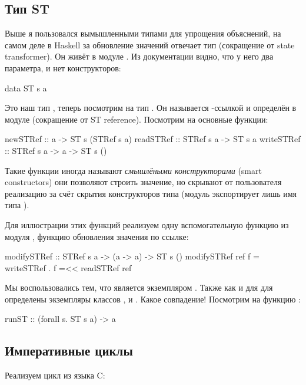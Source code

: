 \subsection{Тип ST}

Выше я пользовался вымышленными типами для упрощения объяснений,
на самом деле в Haskell за обновление значений отвечает тип 
(сокращение от state transformer).
Он живёт в модуле . Из документации
видно, что у него два параметра, и нет конструкторов:

\begin{code}
data ST s a
\end{code}

Это наш тип , теперь посмотрим на тип .
Он называется -ссылкой и определён в модуле 
(сокращение от ST reference). 
Посмотрим на основные функции:

\begin{code}
newSTRef    :: a -> ST s (STRef s a)
readSTRef   :: STRef s a -> ST s a
writeSTRef  :: STRef s a -> a -> ST s ()
\end{code}

Такие функции иногда называют \emph{смышлёными конструкторами}
(smart constructors) они позволяют строить значение, но
скрывают от пользователя реализацию за счёт скрытия конструкторов
типа (модуль экспортирует лишь имя типа ). 

Для иллюстрации этих функций реализуем одну 
вспомогательную функцию из модуля , функцию
обновления значения по ссылке:

\begin{code}
modifySTRef :: STRef s a -> (a -> a) -> ST s ()
modifySTRef ref f = writeSTRef . f =<< readSTRef ref 
\end{code}

Мы воспользовались тем, что  является экземпляром .
Также как и для  для  определены экземпляры 
классов ,  и . 
Какое совпадение! Посмотрим на функцию :

\begin{code}
runST :: (forall s. ST s a) -> a
\end{code}

\subsection{Императивные циклы}

Реализуем  цикл из языка C:

